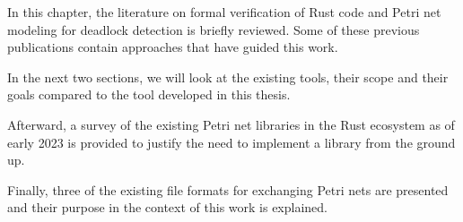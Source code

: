 \documentclass[../../Thesis.tex]{subfiles}
\begin{document}
In this chapter, the literature on formal verification of Rust code
and Petri net modeling for deadlock detection is briefly reviewed.
Some of these previous publications contain approaches
that have guided this work.

In the next two sections, we will look at the existing tools,
their scope and their goals compared to the tool developed in this thesis.

Afterward, a survey of the existing Petri net libraries in the Rust ecosystem
as of early 2023 is provided to justify the need to implement a library
from the ground up.

Finally, three of the existing file formats for exchanging Petri nets are presented
and their purpose in the context of this work is explained.
\end{document}
